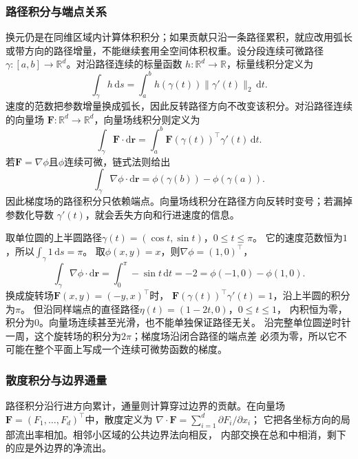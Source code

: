 \subsubsection{路径积分与端点关系}

换元仍是在同维区域内计算体积积分；如果贡献只沿一条路径累积，就应改用弧长或带方向的路径增量，不能继续套用全空间体积权重。设分段连续可微路径$\gamma:[a,b]\to\mathbb{R}^d$。对沿路径连续的标量函数
$h:\mathbb{R}^d\to\mathbb{R}$，标量线积分定义为
\[
  \int_\gamma h\,\mathrm{d}s
  =
  \int_a^b h(\gamma(t))\lVert\gamma'(t)\rVert_2\,\mathrm{d}t.
\]
速度的范数把参数增量换成弧长，因此反转路径方向不改变该积分。对沿路径连续的向量场
$\bm{F}:\mathbb{R}^d\to\mathbb{R}^d$，向量场线积分则定义为
\[   \int_{\gamma}\bm{F}\mathbin{\cdot}\mathrm{d}\bm{r}   =   \int_a^b   \bm{F}(\gamma(t))^{\top}\gamma'(t)\,\mathrm{d}t. \]
若$\bm{F}=\nabla\phi$且$\phi$连续可微，链式法则给出
\begin{equation}
  \int_{\gamma}\nabla\phi\mathbin{\cdot}\mathrm{d}\bm{r}
  =
  \phi(\gamma(b))-\phi(\gamma(a)).
\label{eq:analysis-line-integral-gradient}
\end{equation}
因此梯度场的路径积分只依赖端点。向量场线积分在路径方向反转时变号；若漏掉参数化导数
$\gamma'(t)$，就会丢失方向和行进速度的信息。

\begin{example}
\label{ex:analysis-path-integral-comparison}
取单位圆的上半圆路径$\gamma(t)=(\cos t,\sin t)$，$0\leq t\leq\pi$。
它的速度范数恒为$1$，所以$\int_\gamma1\,\mathrm ds=\pi$。
取$\phi(x,y)=x$，则$\nabla\phi=(1,0)^\top$，
\[
 \int_\gamma\nabla\phi\mathbin{\cdot}\mathrm d\bm r
 =\int_0^\pi-\sin t\,\mathrm dt=-2
 =\phi(-1,0)-\phi(1,0).
\]
换成旋转场$\bm F(x,y)=(-y,x)^\top$时，
$\bm F(\gamma(t))^\top\gamma'(t)=1$，沿上半圆的积分为$\pi$。
但沿同样端点的直径路径$\eta(t)=(1-2t,0)$，$0\leq t\leq1$，
内积恒为零，积分为$0$。向量场连续甚至光滑，也不能单独保证路径无关。
沿完整单位圆逆时针一周，这个旋转场的积分为$2\pi$；梯度场沿闭合路径的端点差
必须为零，所以它不可能在整个平面上写成一个连续可微势函数的梯度。
\end{example}

\subsubsection{散度积分与边界通量}
路径积分沿行进方向累计，通量则计算穿过边界的贡献。在向量场
$\bm F=(F_1,\ldots,F_d)^\top$中，散度定义为
$\nabla\mathbin{\cdot}\bm F=\sum_{i=1}^d\partial F_i/\partial x_i$；
它把各坐标方向的局部流出率相加。相邻小区域的公共边界法向相反，
内部交换在总和中相消，剩下的应是外边界的净流出。

